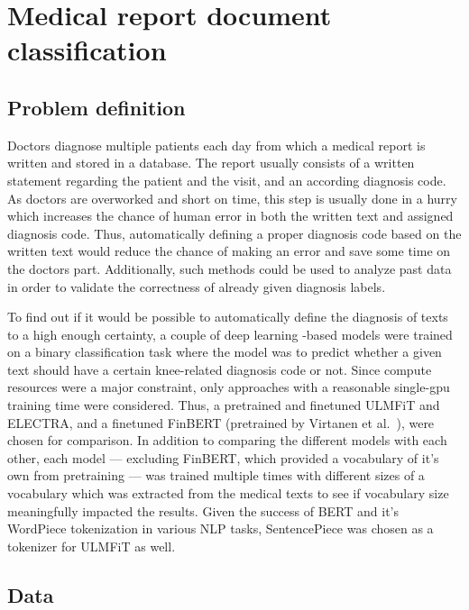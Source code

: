 \chapter{Medical report document classification} \label{Medical report document classification}

\section{Problem definition} \label{Problem definition}

Doctors diagnose multiple patients each day from which a medical report is written and stored in a database.
The report usually consists of a written statement regarding the patient and the visit, and an according diagnosis code.
As doctors are overworked and short on time, this step is usually done in a hurry which increases the chance of human error in both the written text and assigned diagnosis code.
Thus, automatically defining a proper diagnosis code based on the written text would reduce the chance of making an error and save some time on the doctors part.
Additionally, such methods could be used to analyze past data in order to validate the correctness of already given diagnosis labels.


To find out if it would be possible to automatically define the diagnosis of texts to a high enough certainty, a couple of deep learning -based models were trained on a binary classification task where the model was to predict whether a given text should have a certain knee-related diagnosis code or not.
Since compute resources were a major constraint, only approaches with a reasonable single-gpu training time were considered.
Thus, a pretrained and finetuned ULMFiT and ELECTRA, and a finetuned FinBERT (pretrained by Virtanen et al.~\cite{virtanen2019}), were chosen for comparison.
In addition to comparing the different models with each other, each model --- excluding FinBERT, which provided a vocabulary of it's own from pretraining --- was trained multiple times with different sizes of a vocabulary which was extracted from the medical texts to see if vocabulary size meaningfully impacted the results.
Given the success of BERT and it's WordPiece tokenization in various NLP tasks, SentencePiece was chosen as a tokenizer for ULMFiT as well.

\section{Data} \label{Data}
